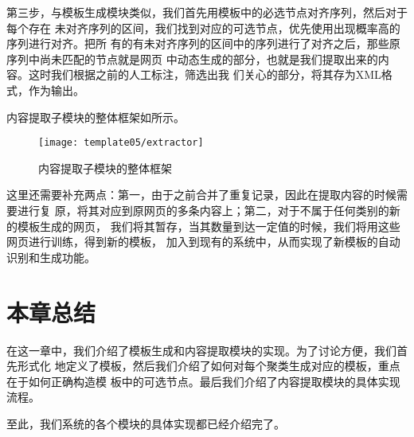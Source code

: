 第三步，与模板生成模块类似，我们首先用模板中的必选节点对齐序列，然后对于每个存在
未对齐序列的区间，我们找到对应的可选节点，优先使用出现概率高的序列进行对齐。把所
有的有未对齐序列的区间中的序列进行了对齐之后，那些原序列中尚未匹配的节点就是网页
中动态生成的部分，也就是我们提取出来的内容。这时我们根据之前的人工标注，筛选出我
们关心的部分，将其存为XML格式，作为输出。

内容提取子模块的整体框架如所示。
\begin{figure}
  \centering
  \texttt{[image: template05/extractor]}
  \caption{内容提取子模块的整体框架}
  \label{template:fig:extractor}
\end{figure}

这里还需要补充两点：第一，由于之前合并了重复记录，因此在提取内容的时候需要进行复
原，将其对应到原网页的多条内容上；第二，对于不属于任何类别的新的模板生成的网页，
我们将其暂存，当其数量到达一定值的时候，我们将用这些网页进行训练，得到新的模板，
加入到现有的系统中，从而实现了新模板的自动识别和生成功能。

\section{本章总结}
\label{sec:summarytemplate}
在这一章中，我们介绍了模板生成和内容提取模块的实现。为了讨论方便，我们首先形式化
地定义了模板，然后我们介绍了如何对每个聚类生成对应的模板，重点在于如何正确构造模
板中的可选节点。最后我们介绍了内容提取模块的具体实现流程。

至此，我们系统的各个模块的具体实现都已经介绍完了。

